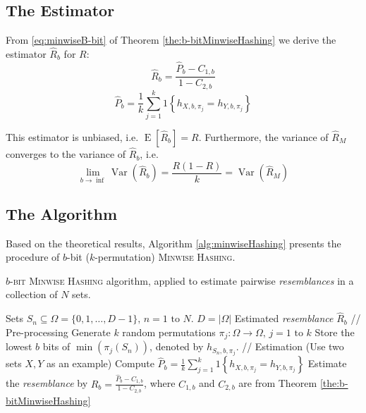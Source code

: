 \documentclass[a4paper]{article}
\DeclareMathOperator{\Var}{Var}
\DeclareMathOperator{\E}{E}
\begin{document}
\subsection{The Estimator}

From \vref{eq:minwiseB-bit} of Theorem \vref{the:b-bitMinwiseHashing} we derive the estimator $\hat{R}_b$ for $R$:
\begin{equation}
\hat{R}_b=\frac{\hat{P}_b-C_{1,b}}{1-C_{2,b}}
\end{equation}
\begin{equation}
\hat{P}_b = \frac{1}{k}\sum_{j=1}^k 1 \left\lbrace  h_{X,b,\pi_j } = h_{Y,b,\pi_j } \right\rbrace
\end{equation}

This estimator is unbiased, i.e. $\E[\hat{R}_b]=R$. Furthermore, the variance of $\hat{R}_M$ converges to the variance of $\hat{R}_b$, i.e.
\begin{equation}
\lim_{b\rightarrow\inf}\Var\left(\hat{R}_b\right)=\frac{R(1-R)}{k}=\Var\left(\hat{R}_M\right)
\end{equation}

\subsection{The Algorithm}

Based on the theoretical results, Algorithm \vref{alg:minwiseHashing} presents the procedure of $b$-bit ($k$-permutation) \textsc{Minwise Hashing}.

\begin{algorithm}[H]
\caption{\textsc{$b$-bit Minwise Hashing} algorithm, applied to estimate pairwise \emph{resemblances} in a collection of $N$ sets.}
\label{alg:minwiseHashing}
\begin{algorithmic}
\Require Sets $S_n \subseteq \Omega = \{0,1,\ldots,D-1\}, \, n = 1 \text{ to } N$. \Comment $D = \left| \Omega \right|$
\Ensure Estimated \emph{resemblance} $\hat{R}_b$
\State // Pre-processing
\State Generate $k$ random permutations $\pi_j: \Omega\longrightarrow\Omega, \, j=1\text{ to }k$
	\State Store the lowest $b$ bits of $\min(\pi_j(S_n))$, denoted by $h_{S_n,b,\pi_j}$.
\EndFor
\State
\State // Estimation (Use two sets $X,Y$ as an example)
\State Compute $\hat{P}_b = \frac{1}{k}\sum_{j=1}^k 1 \left\lbrace  h_{X,b,\pi_j } = h_{Y,b,\pi_j } \right\rbrace$
\State Estimate the \emph{resemblance} by $\hat{R}_b = \frac{\hat{P}_b-C_{1,b}}{1-C_{2,b}}$, where $C_{1,b}$ and $C_{2,b}$ are from Theorem \vref{the:b-bitMinwiseHashing}
\end{algorithmic}
\end{algorithm}
\end{document}
